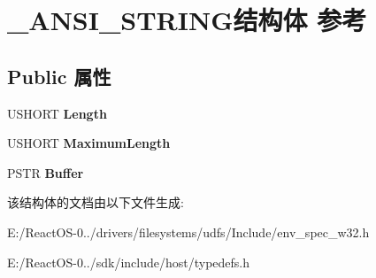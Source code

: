 \hypertarget{struct___a_n_s_i___s_t_r_i_n_g}{}\section{\+\_\+\+A\+N\+S\+I\+\_\+\+S\+T\+R\+I\+N\+G结构体 参考}
\label{struct___a_n_s_i___s_t_r_i_n_g}
\subsection*{Public 属性}
\begin{DoxyCompactItemize}
\item 
\mbox{\label{struct___a_n_s_i___s_t_r_i_n_g_ab41c57e3dfc9f8f8b4c9df95d102d784}} 
U\+S\+H\+O\+RT {\bfseries Length}
\item 
\mbox{\label{struct___a_n_s_i___s_t_r_i_n_g_a89ab5fc3e017d72257a306e85e0ae555}} 
U\+S\+H\+O\+RT {\bfseries Maximum\+Length}
\item 
\mbox{\label{struct___a_n_s_i___s_t_r_i_n_g_a014219be09757f20030412f1300fe16b}} 
P\+S\+TR {\bfseries Buffer}
\end{DoxyCompactItemize}


该结构体的文档由以下文件生成\+:\begin{DoxyCompactItemize}
\item 
E\+:/\+React\+O\+S-\/0../drivers/filesystems/udfs/\+Include/env\+\_\+spec\+\_\+w32.\+h\item 
E\+:/\+React\+O\+S-\/0../sdk/include/host/typedefs.\+h\end{DoxyCompactItemize}
